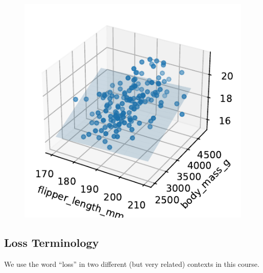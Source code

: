 \documentclass[
  letterpaper,
  DIV=11,
  numbers=noendperiod]{scrreprt}
\begin{document}
\begin{figure}[H]

{\centering \includegraphics{gradient_descent/gradient_descent_files/figure-pdf/cell-20-output-1.pdf}

}

\end{figure}

\hypertarget{loss-terminology}{%
\subsection{Loss Terminology}\label{loss-terminology}}

We use the word ``loss'' in two different (but very related) contexts in
this course.
\end{document}
